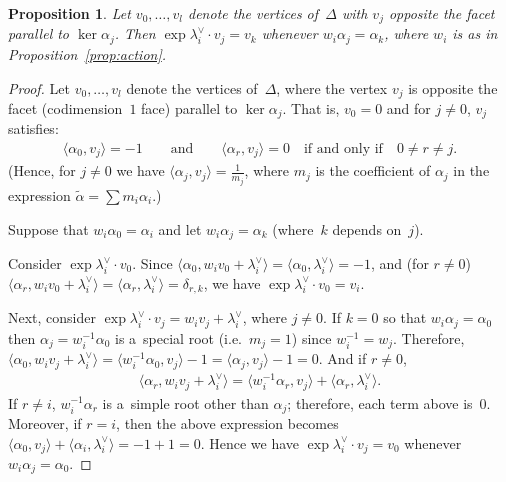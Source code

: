\documentclass[pdftex]{sigma}
\numberwithin{equation}{section}
\newtheorem{Proposition}[Theorem]{Proposition}
{\theoremstyle{definition}
\newtheorem{Definition}[Theorem]{Definition}
\newtheorem{Example}[Theorem]{Example}
\newtheorem{Remark}[Theorem]{Remark}
}
\begin{document}
\begin{Proposition}
\label{prop:dynk}
Let $v_0, \ldots, v_l$ denote the vertices of~$\Delta$ with $v_j$ opposite the facet parallel to $\ker \alpha_j$.
Then $\exp \lambda_i^\vee \cdot v_j = v_k$ whenever $w_i \alpha_j = \alpha_k$, where $w_i$ is as in
Proposition~{\rm \ref{prop:action}}.
\end{Proposition}
\begin{proof}
Let $v_0, \ldots, v_l$ denote the vertices of~$\Delta$, where the vertex $v_j$ is opposite the facet (codimension~$1$
face) parallel to $\ker \alpha_j$.
That is, $v_0=0$ and for $j\neq 0$, $v_j$ satisf\/ies:
\begin{gather*}
\langle \alpha_0,v_j\rangle = -1
\qquad
\text{and}
\qquad
\langle\alpha_r,v_j\rangle = 0
\quad
\text{if and only if}
\quad
0\neq r\neq j.
\end{gather*}
(Hence, for $j\neq 0$ we have $\langle\alpha_j,v_j\rangle = \frac{1}{m_j}$, where $m_j$ is the coef\/f\/icient of $\alpha_j$
in the expression $\tilde\alpha = \sum m_i\alpha_i$.)

Suppose that $w_i\alpha_0 = \alpha_i$ and let $w_i\alpha_j=\alpha_k$ (where~$k$ depends on~$j$).

Consider $\exp \lambda_i^\vee \cdot v_0$.
Since $\langle \alpha_0,w_i v_0+\lambda_i^\vee\rangle = \langle\alpha_0,\lambda_i^\vee\rangle = -1$, and (for $r\neq 0$)
$\langle \alpha_r,w_iv_0 +\lambda_i^\vee\rangle=\langle\alpha_r,\lambda_i^\vee\rangle = \delta_{r,k}$, we have $\exp
\lambda_i^\vee \cdot v_0 = v_i$.

Next, consider $\exp \lambda_i^\vee \cdot v_j=w_i v_j + \lambda_i^\vee$, where $j\neq 0$.
If $k=0$ so that $w_i\alpha_j=\alpha_0$ then $\alpha_j=w_i^{-1} \alpha_0$ is a~special root (i.e.~$m_j=1$) since
$w_i^{-1}=w_j$.
Therefore, $\langle\alpha_0,w_i v_j+\lambda_i^\vee\rangle = \langle w_i^{-1}\alpha_0,v_j\rangle-1= \langle
\alpha_j,v_j\rangle-1=0$.
And if $r\neq 0$,
\begin{gather}
\label{eq:idvert}
\langle\alpha_r,w_i v_j+\lambda_i^\vee\rangle = \langle w_i^{-1} \alpha_r,v_j\rangle + \langle
\alpha_r,\lambda_i^\vee\rangle.
\end{gather}
If $r\neq i$, $w_i^{-1} \alpha_r$ is a~simple root other than $\alpha_j$; therefore, each term above is~$0$.
Moreover, if $r=i$, then the above expression becomes $\langle \alpha_0,v_j \rangle +
\langle\alpha_i,\lambda_i^\vee\rangle = -1+1=0$.
Hence we have $\exp \lambda_i^\vee \cdot v_j = v_0$ whenever $w_i\alpha_j = \alpha_0$.


\end{proof}
\end{document}
